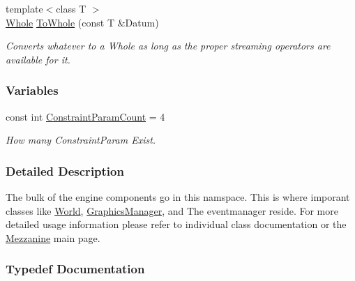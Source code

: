 \begin{DoxyCompactItemize}
{\footnotesize template$<$class T $>$ }\\\hyperlink{namespaceMezzanine_adcbb6ce6d1eb4379d109e51171e2e493}{Whole} \hyperlink{namespaceMezzanine_a5df12bb5a875e3b8f8e28f2dd91a5304}{ToWhole} (const T \&Datum)
\begin{DoxyCompactList}\small\item\em Converts whatever to a Whole as long as the proper streaming operators are available for it. \item\end{DoxyCompactList}\end{DoxyCompactItemize}
\subsubsection*{Variables}
\begin{DoxyCompactItemize}
\item 
const int \hyperlink{namespaceMezzanine_affe44b22cef36683c2cc9025bf45b202}{ConstraintParamCount} = 4
\begin{DoxyCompactList}\small\item\em How many ConstraintParam Exist. \item\end{DoxyCompactList}\end{DoxyCompactItemize}


\subsubsection{Detailed Description}
The bulk of the engine components go in this namspace. This is where imporant classes like \hyperlink{classMezzanine_1_1World}{World}, \hyperlink{classMezzanine_1_1GraphicsManager}{GraphicsManager}, and The eventmanager reside. For more detailed usage information please refer to individual class documentation or the \hyperlink{index}{Mezzanine} main page. 

\subsubsection{Typedef Documentation}
\hypertarget{namespaceMezzanine_ad5147a419db7627ee552a2b582f1052d}{
\paragraph[{Character}]{}\hfill}
\label{namespaceMezzanine_ad5147a419db7627ee552a2b582f1052d}


